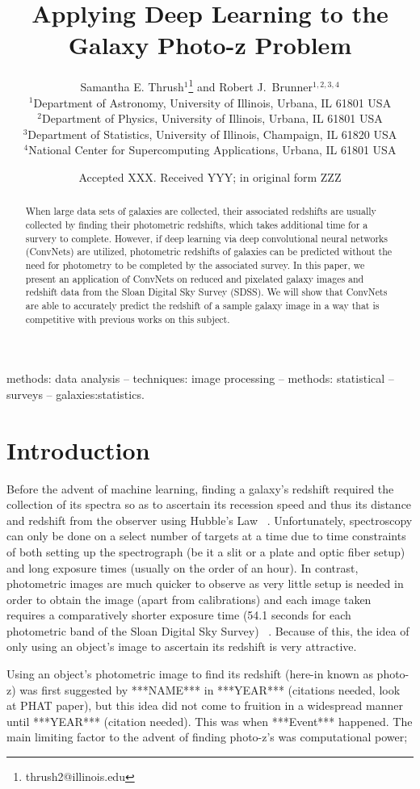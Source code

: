 \documentclass[fleqn,usenatbib]{mnras}
\title[Dreaming of Photo-z's]{Applying Deep Learning to the Galaxy Photo-z Problem}
\author[S. E. Thrush and R. J. Brunner]{
  Samantha E. Thrush$^1$\thanks{thrush2@illinois.edu} and Robert J.~Brunner$^{1,2,3,4}$ \\
$^1$Department of Astronomy, University of Illinois, Urbana, IL 61801 USA\\
$^2$Department of Physics, University of Illinois, Urbana, IL 61801 USA\\
$^3$Department of Statistics, University of Illinois, Champaign, IL 61820 USA\\
$^4$National Center for Supercomputing Applications, Urbana, IL 61801 USA
}
\date{Accepted XXX. Received YYY; in original form ZZZ}
\begin{document}
\label{firstpage}
\pagerange{\pageref{firstpage}--\pageref{lastpage}}
\maketitle

\begin{abstract}
When large data sets of galaxies are collected, their associated redshifts are usually collected by finding their photometric redshifts, which takes additional time for a survery to complete.  However, if deep learning via deep convolutional neural networks (ConvNets) are utilized, photometric redshifts of galaxies can be predicted without the need for photometry to be completed by the associated survey. In this paper, we present an application of ConvNets on reduced and pixelated galaxy images and redshift data from the Sloan Digital Sky Survey (SDSS).  We will show that ConvNets are able to accurately predict the redshift of a sample galaxy image in a way that is competitive with previous works on this subject.
\end{abstract}

\begin{keywords}
methods: data analysis -- techniques: image processing -- methods: statistical
-- surveys -- galaxies:statistics.
\end{keywords}

\section{Introduction}
  \label{sec:introduction}
Before the advent of machine learning, finding a galaxy's redshift required the collection of its spectra so as to ascertain its recession speed and thus its distance and redshift from the observer using Hubble's Law ~\citep{hubble_relation_1929}. Unfortunately, spectroscopy can only be done on a select number of targets at a time due to time constraints of both setting up the spectrograph (be it a slit or a plate and optic fiber setup) and long exposure times (usually on the order of an hour).  In contrast, photometric images are much quicker to observe as very little setup is needed in order to obtain the image (apart from calibrations) and each image taken requires a comparatively shorter exposure time (54.1 seconds for each photometric band of the Sloan Digital Sky Survey) ~\citep{york_sloan_2000}.  Because of this, the idea of only using an object's image to ascertain its redshift is very attractive.  

Using an object's photometric image to find its redshift (here-in known as photo-z) was first suggested by ***NAME*** in ***YEAR*** (citations needed, look at PHAT paper), but this idea did not come to fruition in a widespread manner until ***YEAR*** (citation needed).  This was when ***Event*** happened.  The main limiting factor to the advent of finding photo-z's was computational power; 
\end{document}
